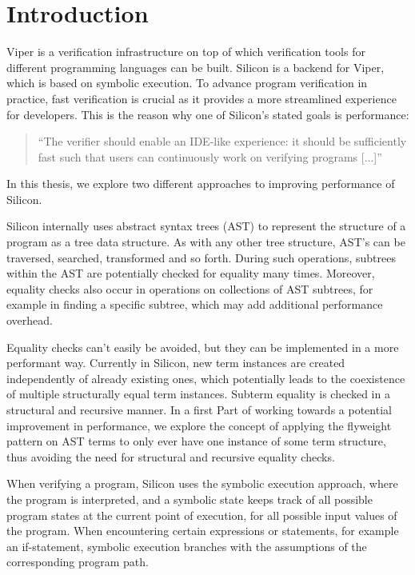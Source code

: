 \documentclass[11pt]{article}
\begin{document}
    \tableofcontents
    \newpage


    \section{Introduction}

    Viper \cite{viper} is a verification infrastructure on top of which verification tools
    for different programming languages can be built. Silicon \cite{silicon} is a backend for Viper,
    which is based on symbolic execution. To advance program verification in practice,
    fast verification is crucial as it provides a more streamlined experience for developers.
    This is the reason why one of Silicon's stated goals is performance:

    \begin{quote} 
        ``The verifier should enable an IDE-like experience: it should be
        sufficiently fast such that users can continuously work on verifying
        programs [...]'' \cite{silicon}
    \end{quote}

    In this thesis, we explore two different approaches to improving performance of Silicon.

    Silicon internally uses abstract syntax trees (AST) to represent
    the structure of a program as a tree data structure. As with any other tree structure,
    AST's can be traversed, searched, transformed and so forth. During such operations,
    subtrees within the AST are potentially checked for equality many times.  Moreover, equality checks
    also occur in operations on collections of AST subtrees, for example in finding
    a specific subtree, which may add additional performance overhead.

    Equality checks can't easily be avoided, but they can be implemented in a more performant way.
    Currently in Silicon, new term instances are created independently of already existing ones, which potentially leads 
    to the coexistence of multiple structurally equal term instances. Subterm equality is checked in a
    structural and recursive manner. In a first Part of working towards a potential improvement in performance,
    we explore the concept of applying the flyweight pattern \cite{patterns} on AST terms to only ever have
    one instance of some term structure, thus avoiding the need for structural and recursive equality checks.

    When verifying a program, Silicon uses the symbolic execution approach, where the program is interpreted,
    and a symbolic state keeps track of all possible program states at the current point of execution, for all
    possible input values of the program. When encountering certain expressions or statements, for example an
    if-statement, symbolic execution branches with the assumptions of the corresponding program path.
\end{document}
